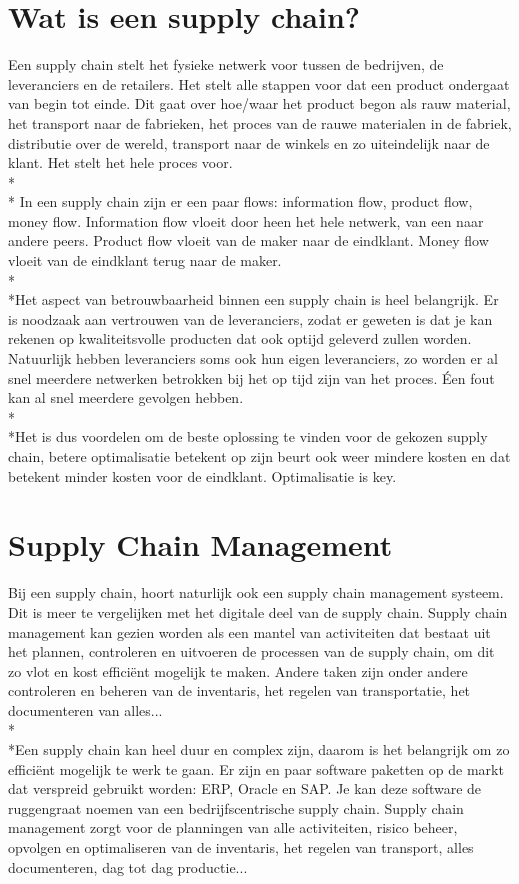 \documentclass[fleqn,a4paper,12pt]{book}
\begin{document}
\section{Wat is een supply chain?}
Een supply chain stelt het fysieke netwerk voor tussen de bedrijven, de leveranciers en de retailers. Het stelt alle stappen voor dat een product ondergaat van begin tot einde. Dit gaat over hoe/waar het product begon als 
rauw material, het transport naar de fabrieken, het proces van de rauwe materialen in de fabriek, distributie over de wereld, transport naar de winkels en zo uiteindelijk naar de klant. Het stelt het hele proces voor.\\*\\* In een supply chain zijn er een paar flows: information flow, product flow, money flow. Information flow vloeit door heen het hele netwerk, van een naar andere peers. Product flow vloeit van de maker naar de eindklant. Money flow vloeit van de eindklant terug naar de maker.\\*\\*Het aspect van betrouwbaarheid binnen een supply chain is heel belangrijk. Er is noodzaak aan vertrouwen van de leveranciers, zodat er geweten is dat je kan rekenen op kwaliteitsvolle producten dat ook optijd geleverd zullen worden. Natuurlijk hebben leveranciers soms ook hun eigen leveranciers, zo worden er al snel meerdere netwerken betrokken bij het op tijd zijn van het proces. Éen fout kan al snel meerdere gevolgen hebben.\\*\\*Het is dus voordelen om de beste oplossing te vinden voor de gekozen supply chain, betere optimalisatie betekent op zijn beurt ook weer mindere kosten en dat betekent minder kosten voor de eindklant. Optimalisatie is key.

\section{Supply Chain Management}
Bij een supply chain, hoort naturlijk ook een supply chain management systeem. Dit is meer te vergelijken met het digitale deel van de supply chain. Supply chain management kan gezien worden als een mantel van activiteiten dat bestaat uit het plannen, controleren en uitvoeren de processen van de supply chain, om dit zo vlot en kost efficiënt mogelijk te maken. Andere taken zijn onder andere controleren en beheren van de inventaris, het regelen van transportatie, het documenteren van alles...\\*\\*Een supply chain kan heel duur en complex zijn, daarom is het belangrijk om zo efficiënt mogelijk te werk te gaan. Er zijn en paar software paketten op de markt dat verspreid gebruikt worden: ERP, Oracle en SAP. Je kan deze software de ruggengraat noemen van een bedrijfscentrische supply chain. Supply chain management zorgt voor de planningen van alle activiteiten, risico beheer, opvolgen en optimaliseren van de inventaris, het regelen van transport, alles documenteren, dag tot dag productie...
~\autocite{scm1}
\end{document}
